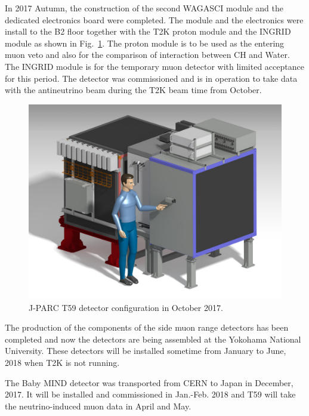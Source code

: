 In 2017 Autumn, the construction of the second WAGASCI module and the dedicated electronics board were completed.
The module and the electronics were install to the B2 floor together with the T2K proton module and the INGRID
module as shown in Fig.~\ref{fig:det_confg_oct_dec2017}.
The proton module is to be used as the entering muon veto and also for the comparison of interaction between CH and Water.
The INGRID module is for the temporary muon detector with limited acceptance for this period.
The detector was commissioned and is in operation to take data with the antineutrino beam during the T2K beam time from October.

 \begin{figure}[tbhp]
 \begin{center}
\includegraphics[width=0.6\linewidth]{fig/Proton_Wagasci_Ingrid_Configuration.pdf}
 \end{center}
 \caption{
 J-PARC T59 detector configuration in October 2017.
 }
 \label{fig:det_confg_oct_dec2017}
 \end{figure}

The production of the components of the side muon range detectors has been completed and now the detectors
are being assembled at the Yokohama National University.
These detectors will be installed sometime from January to June, 2018 when T2K is not running.

The Baby MIND detector was transported from CERN to Japan in December, 2017.
It will be installed and commissioned in Jan.-Feb. 2018 and T59 will take the neutrino-induced muon data in April and May.



